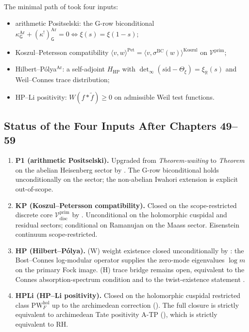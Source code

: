 The minimal path of  took four
inputs:
\begin{itemize}
\item[(P1)] arithmetic Positselski: the G-row biconditional
\(\kappa^{\mathrm{Ar}}_{\mathsf{G}}+(\kappa^{!})^{\mathrm{Ar}}_{\mathsf{G}}=0
\Leftrightarrow \xi(s)=\xi(1-s)\);
\item[(KP)] Koszul--Petersson compatibility
\(\langle v,w\rangle^{\mathrm{Pet}}=\langle v,\sigma^{\mathrm{BC}}(w)\rangle^{\mathrm{Koszul}}\)
on \(\mathcal{V}^{\mathrm{prim}}\);
\item[(HP)] Hilbert--P\'olya\(^{\mathrm{Ar}}\): a self-adjoint
\(H_{\mathrm{HP}}\) with
\(\det_{\infty}(s\mathrm{id}-\Theta_{\xi})=\xi_{\mathbb{R}}(s)\)
and Weil--Connes trace distribution;
\item[(HPLi)] HP--Li positivity:
\(W(f*\widetilde{f})\geq 0\) on admissible Weil test functions.
\end{itemize}

\subsection{Status of the Four Inputs After Chapters 49--59}
\label{v4-arith:w5-synth:per-input}

\begin{enumerate}
\item \textbf{P1 (arithmetic Positselski).} Upgraded from
\emph{Theorem-waiting} to \emph{Theorem} on the abelian Heisenberg
sector by . The
G-row biconditional holds unconditionally on the sector; the
non-abelian Iwahori extension is explicit out-of-scope.
\item \textbf{KP (Koszul--Petersson compatibility).} Closed on the
scope-restricted discrete core
\(\mathcal{V}^{\mathrm{prim}}_{\mathrm{disc}}\) by
. Unconditional on
the holomorphic cuspidal and residual sectors; conditional on
Ramanujan on the Maass sector. Eisenstein continuum
scope-restricted.
\item \textbf{HP (Hilbert--P\'olya).} (W) weight existence closed
unconditionally by
: the Bost--Connes
log-modular operator supplies the zero-mode eigenvalues \(\log m\)
on the primary Fock image. (H) trace bridge remains open,
equivalent to the Connes absorption-spectrum condition and to the
twist-existence statement
.
\item \textbf{HPLi (HP--Li positivity).} Closed on the holomorphic
cuspidal restricted class \(\mathrm{PW}^{\mathrm{hol}}_{F}\) up to
the archimedean correction
(). The full closure is
strictly equivalent to archimedean Tate positivity A-TP
(), which is
strictly equivalent to RH.
\end{enumerate}

